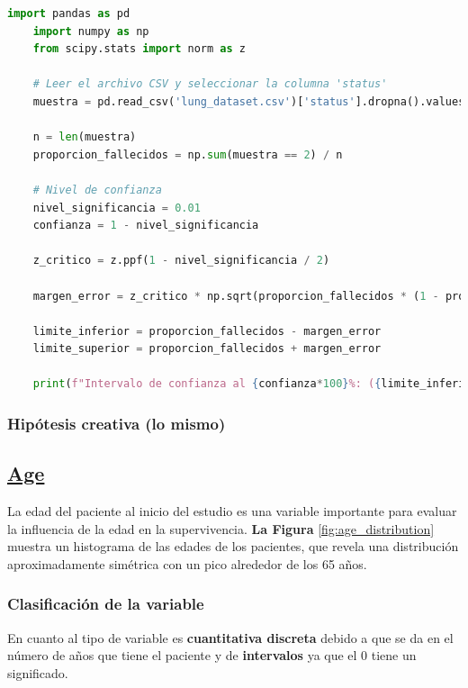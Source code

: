 \documentclass[a4paper,12pt]{article}
\begin{document}
\begin{lstlisting}[language=Python, caption={Código en Python para calcular el intervalo de confianza},label={2st:intervalo_confianza_normal}]
    import pandas as pd
    import numpy as np
    from scipy.stats import norm as z
    
    # Leer el archivo CSV y seleccionar la columna 'status'
    muestra = pd.read_csv('lung_dataset.csv')['status'].dropna().values
    
    n = len(muestra)
    proporcion_fallecidos = np.sum(muestra == 2) / n
    
    # Nivel de confianza
    nivel_significancia = 0.01
    confianza = 1 - nivel_significancia
    
    z_critico = z.ppf(1 - nivel_significancia / 2)

    margen_error = z_critico * np.sqrt(proporcion_fallecidos * (1 - proporcion_fallecidos) / n)
    
    limite_inferior = proporcion_fallecidos - margen_error
    limite_superior = proporcion_fallecidos + margen_error

    print(f"Intervalo de confianza al {confianza*100}%: ({limite_inferior}, {limite_superior})")

\end{lstlisting}

\subsubsection*{Hipótesis creativa (lo mismo)}


    \subsection*{\underline{Age}}

    La edad del paciente al inicio del estudio es una variable importante para evaluar la influencia de la edad en la supervivencia. \textbf{La Figura }\ref{fig:age_distribution} muestra un histograma de las edades de los pacientes, que revela una distribución aproximadamente simétrica con un pico alrededor de los 65 años.
	
    \subsubsection*{Clasificación de la variable}

    En cuanto al tipo de variable es \textbf{cuantitativa discreta} debido a que se da en el número de años que tiene el paciente y de \textbf{intervalos} ya que el 0 tiene un significado.    
\end{document}
